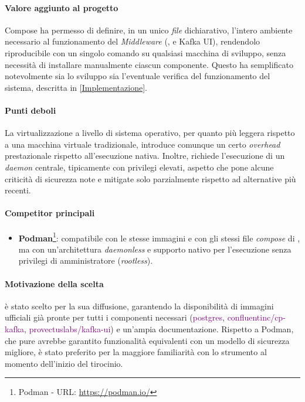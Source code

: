 \paragraph{Valore aggiunto al progetto}
 Compose ha permesso di definire, in un unico \textit{file} dichiarativo, l'intero ambiente necessario al funzionamento del \textit{Middleware} (,  e Kafka UI), rendendolo riproducibile con un singolo comando su qualsiasi macchina di sviluppo, senza necessità di installare manualmente ciascun componente. Questo ha semplificato notevolmente sia lo sviluppo sia l'eventuale verifica del funzionamento del sistema, descritta in \ref{Implementazione}.

\paragraph{Punti deboli}
La virtualizzazione a livello di sistema operativo, per quanto più leggera rispetto a una macchina virtuale tradizionale, introduce comunque un certo \textit{overhead} prestazionale rispetto all'esecuzione nativa. Inoltre,  richiede l'esecuzione di un \textit{daemon} centrale, tipicamente con privilegi elevati, aspetto che pone alcune criticità di sicurezza note e mitigate solo parzialmente rispetto ad alternative più recenti.

\paragraph{Competitor principali}
\begin{itemize}
    \item \textbf{Podman}\footnote{Podman - URL: \url{https://podman.io/}}: compatibile con le stesse immagini e con gli stessi file \textit{compose} di , ma con un'architettura \textit{daemonless} e supporto nativo per l'esecuzione senza privilegi di amministratore (\textit{rootless}).
\end{itemize}

\newpage
\paragraph{Motivazione della scelta}
 è stato scelto per la sua diffusione, garantendo la disponibilità di immagini ufficiali già pronte per tutti i componenti necessari (\textcolor{purple}{postgres}, \textcolor{purple}{confluentinc/cp-kafka}, \textcolor{purple}{provectuslabs/kafka-ui}) e un'ampia documentazione. Rispetto a Podman, che pure avrebbe garantito funzionalità equivalenti con un modello di sicurezza migliore,  è stato preferito per la maggiore familiarità con lo strumento al momento dell'inizio del tirocinio.

